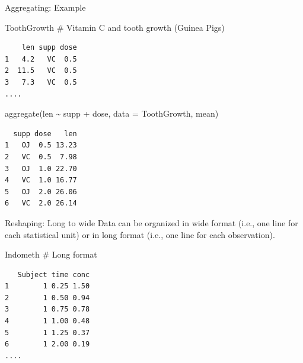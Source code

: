 \documentclass[
  ignorenonframetext,
]{beamer}
\newenvironment{Shaded}{\begin{snugshade}}{\end{snugshade}}
\newcommand{\AttributeTok}[1]{\textcolor[rgb]{0.00,0.34,0.68}{#1}}
\newcommand{\CommentTok}[1]{\textcolor[rgb]{0.54,0.53,0.53}{#1}}
\newcommand{\FunctionTok}[1]{\textcolor[rgb]{0.39,0.29,0.61}{#1}}
\newcommand{\NormalTok}[1]{\textcolor[rgb]{0.12,0.11,0.11}{#1}}
\newcommand{\SpecialCharTok}[1]{\textcolor[rgb]{0.24,0.68,0.91}{#1}}
\begin{document}
\begin{frame}[fragile]{Aggregating: Example}
\protect\hypertarget{aggregating-example}{}
\small

\begin{Shaded}
\begin{Highlighting}[]
\NormalTok{ToothGrowth }\CommentTok{\# Vitamin C and tooth growth (Guinea Pigs)}
\end{Highlighting}
\end{Shaded}

\begin{verbatim}
    len supp dose
1   4.2   VC  0.5
2  11.5   VC  0.5
3   7.3   VC  0.5
....
\end{verbatim}

\begin{Shaded}
\begin{Highlighting}[]
\FunctionTok{aggregate}\NormalTok{(len }\SpecialCharTok{\textasciitilde{}}\NormalTok{ supp }\SpecialCharTok{+}\NormalTok{ dose, }\AttributeTok{data =}\NormalTok{ ToothGrowth, mean)}
\end{Highlighting}
\end{Shaded}

\begin{verbatim}
  supp dose   len
1   OJ  0.5 13.23
2   VC  0.5  7.98
3   OJ  1.0 22.70
4   VC  1.0 16.77
5   OJ  2.0 26.06
6   VC  2.0 26.14
\end{verbatim}
\end{frame}

\begin{frame}[fragile]{Reshaping: Long to wide}
\protect\hypertarget{reshaping-long-to-wide}{}
Data can be organized in wide format (i.e., one line for each
statistical unit) or in long format (i.e., one line for each
observation).

\begin{Shaded}
\begin{Highlighting}[]
\NormalTok{Indometh }\CommentTok{\# Long format}
\end{Highlighting}
\end{Shaded}

\begin{verbatim}
   Subject time conc
1        1 0.25 1.50
2        1 0.50 0.94
3        1 0.75 0.78
4        1 1.00 0.48
5        1 1.25 0.37
6        1 2.00 0.19
....
\end{verbatim}
\end{frame}
\end{document}
